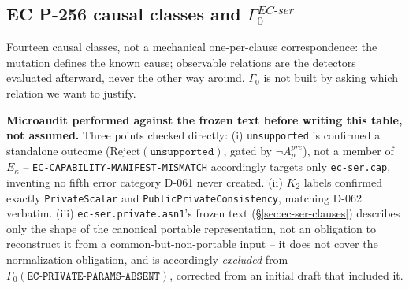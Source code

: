 \documentclass[11pt,a4paper]{article}
\begin{document}
\subsection{EC P-256 causal classes and \texorpdfstring{$\Gamma_0^{EC\text{-}ser}$}{Gamma-0 EC-ser}}\label{sec:ec-ser-gamma0}

Fourteen causal classes, not a mechanical one-per-clause correspondence: the mutation defines the known cause; observable relations are the detectors evaluated afterward, never the other way around. $\Gamma_0$ is not built by asking which relation we want to justify.

\textbf{Microaudit performed against the frozen text before writing this table, not assumed.} Three points checked directly: (i) \texttt{unsupported} is confirmed a standalone outcome ($\text{Reject}(\texttt{unsupported})$, gated by $\neg A_p^{pre}$), not a member of $E_\kappa$ -- \texttt{EC-CAPABILITY-MANIFEST-MISMATCH} accordingly targets only \texttt{ec-ser.cap}, inventing no fifth error category D-061 never created. (ii) $K_2$ labels confirmed exactly \texttt{PrivateScalar} and \texttt{PublicPrivateConsistency}, matching D-062 verbatim. (iii) \texttt{ec-ser.private.asn1}'s frozen text (\S\ref{sec:ec-ser-clauses}) describes only the shape of the canonical portable representation, not an obligation to reconstruct it from a common-but-non-portable input -- it does not cover the normalization obligation, and is accordingly \emph{excluded} from $\Gamma_0(\texttt{EC-PRIVATE-PARAMS-ABSENT})$, corrected from an initial draft that included it.
\end{document}
